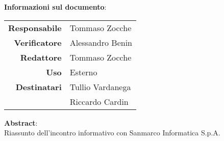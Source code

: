 \begin{center}
\textbf{Informazioni sul documento}: \\
\vspace{0.5cm}

\begin{tabular}{r|l}
    \textbf{Responsabile} & Tommaso Zocche \\
    \textbf{Verificatore} & Alessandro Benin \\ 
    \textbf{Redattore} & Tommaso Zocche \\
    \textbf{Uso} & Esterno \\ 
    \textbf{Destinatari} & Tullio Vardanega \\ & Riccardo Cardin \\ 
\end{tabular}

\vfill

\textbf{Abstract}: \\
\vspace{0.5cm}
Riassunto dell'incontro informativo con Sanmarco Informatica S.p.A.
\end{center}


\bigskip